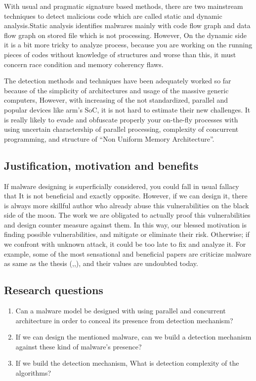 With usual and pragmatic signature based methods, there are two mainstream techniques to detect malicious code which are called static and dynamic analysis.Static analysis identifies malwares mainly with code flow graph and data flow graph on stored file which is not processing. However, On the dynamic side it is a bit more tricky to analyze process, because you are working on the running pieces of codes without knowledge of structures and worse than this, it must concern race condition and memory coherency flaws.

The detection methods and techniques have been adequately worked so far because of the simplicity of architectures and usage of the massive generic computers, However, with increasing of the not standardized, parallel and popular devices like arm’s SoC, it is not hard to estimate their new challenges. It is really likely to evade and obfuscate properly your on-the-fly processes with using uncertain charactership of parallel processing, complexity of concurrent programming, and structure of “Non Uniform Memory Architecture”.


\subsection{Justification, motivation and benefits}
If malware designing is superficially considered, you could fall in usual fallacy that It is not beneficial and exactly opposite. However, if we can design it, there is always more skillful author who already abuse this vulnerabilities on the black side of the moon. The work we are obligated to actually proof this vulnerabilities and design counter measure against them. In this way, our blessed motivation is finding possible vulnerabilities, and mitigate or eliminate their risk. Otherwise; if we confront with unknown attack, it could be too late to fix and analyze it. For example, some of the most sensational and beneficial papers are criticize malware as same as the thesis (\cite{moser2007limits},\cite{cavallaro2008limits},\cite{egele2012survey}), and their values are undoubted today. 

\subsection{Research questions}\label{research:questions}

\begin{enumerate}
\item Can a malware model be designed with using parallel and concurrent architecture in order to conceal its presence from detection mechanism?
\item If we can design the mentioned malware, can we build a detection mechanism against these kind of malware's presence?
\item If we build the detection mechanism, What is detection complexity of the algorithms?
\end{enumerate}


